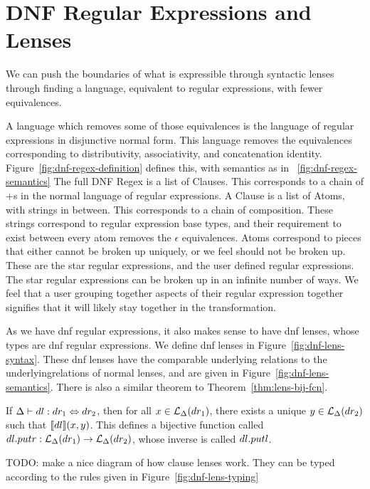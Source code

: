 \section{DNF Regular Expressions and Lenses}
We can push the boundaries of what is expressible through syntactic lenses
through finding a language, equivalent to regular expressions, with fewer
equivalences.



A language which removes some of those equivalences is the language of regular
expressions in disjunctive normal form.  This language removes the
equivalences corresponding to distributivity, associativity, and concatenation identity.
Figure~\ref{fig:dnf-regex-definition} defines this, with semantics as in
~\ref{fig:dnf-regex-semantics}
The full DNF Regex is a list of Clauses.  This corresponds to a chain of $+$s
in the normal language of regular expressions.
A Clause is a list of Atoms, with strings in between.
This corresponds to a chain of composition.  These strings
correspond to regular expression base types, and their requirement to
exist between every atom removes the $\epsilon$ equivalences.
Atoms correspond to pieces that either cannot be broken up uniquely, or we feel should not be broken up.
These are the star regular expressions, and the user defined regular expressions.
The star regular expressions can be broken up in an infinite number of ways.
We feel that a user grouping together aspects of their regular expression together
signifies that it will likely stay together in the transformation.




As we have dnf regular expressions, it also makes sense to have dnf lenses,
whose types are dnf regular expressions.  We define dnf lenses in Figure~\ref{fig:dnf-lens-syntax}.
These dnf lenses have the comparable underlying relations to the underlyingrelations 
of normal lenses, and are given in Figure~\ref{fig:dnf-lens-semantics}.
There is also a similar theorem to Theorem~\ref{thm:lens-bij-fcn}.
\begin{theorem}
\label{thm:dnf-lens-bij-fcn}
If $\Delta \vdash dl : dr_1 \Leftrightarrow dr_2$,
then for all $x \in \mathcal{L}_{\Delta}(dr_1)$, there exists a unique $y \in \mathcal{L}_{\Delta}(dr_2)$ such that $[ \! [dl] \! ](x,y)$.
This defines a bijective function called $dl.putr : \mathcal{L}_{\Delta}(dr_1) \rightarrow \mathcal{L}_{\Delta}(dr_2)$,
whose inverse is called $dl.putl$.
\end{theorem}
TODO: make a nice diagram of how clause lenses work.
They can be typed according to the rules given in Figure~\ref{fig:dnf-lens-typing}

